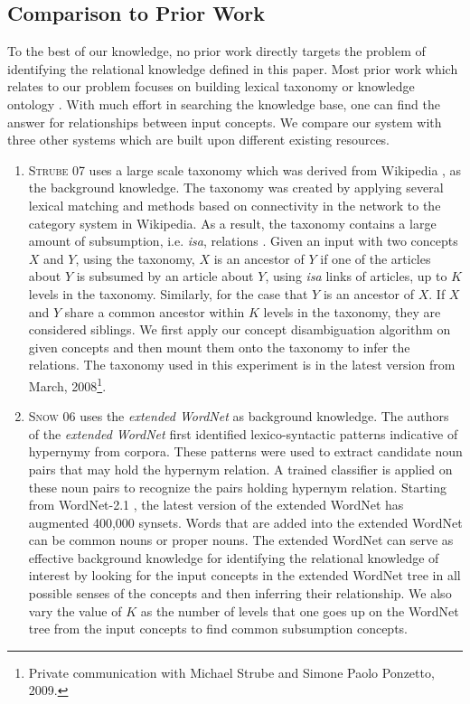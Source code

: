 \subsection{Comparison to Prior Work}

To the best of our knowledge, no prior work directly targets the
problem of identifying the relational knowledge defined in this
paper. Most prior work which relates to our problem focuses on
building lexical taxonomy or knowledge ontology
\cite{Snow2006,wikitaxo07,suchanek2007WWW}. With much effort in
searching the knowledge base, one can find the answer for relationships
between input concepts. We compare our system with three other systems
which are built upon different existing resources.

\begin{enumerate}

\item \textsc{Strube 07} uses a large scale taxonomy which was derived
  from Wikipedia \cite{wikitaxo07}, as the background knowledge. The
  taxonomy was created by applying several lexical matching and
  methods based on connectivity in the network to the category system
  in Wikipedia. As a result, the taxonomy contains a large amount of
  subsumption, i.e. {\em isa}, relations \cite{wikitaxo07}. Given an
  input with two concepts $X$ and $Y$, using the taxonomy, $X$ is an
  ancestor of $Y$ if one of the articles about $Y$ is subsumed by an
  article about $Y$, using {\em isa} links of articles, up to $K$
  levels in the taxonomy.  Similarly, for the case that $Y$ is an
  ancestor of $X$. If $X$ and $Y$ share a common ancestor within $K$
  levels in the taxonomy, they are considered siblings. We first apply
  our concept disambiguation algorithm on given concepts and then
  mount them onto the taxonomy to infer the relations. The taxonomy
  used in this experiment is in the latest version from March,
  2008\footnote{Private communication with Michael Strube and Simone
    Paolo Ponzetto, 2009.}.

\item \textsc{Snow 06} uses the {\em extended WordNet}
  \cite{ilprints665,Snow2006} as background knowledge. The authors of
  the {\em extended WordNet} \cite{ilprints665} first identified
  lexico-syntactic patterns indicative of hypernymy from
  corpora. These patterns were used to extract candidate noun pairs
  that may hold the hypernym relation. A trained classifier is applied
  on these noun pairs to recognize the pairs holding hypernym
  relation. Starting from WordNet-2.1 \cite{Fellbaum98}, the latest
  version of the extended WordNet has augmented 400,000 synsets. Words
  that are added into the extended WordNet can be common nouns or
  proper nouns. The extended WordNet can serve as effective background
  knowledge for identifying the relational knowledge of interest by
  looking for the input concepts in the extended WordNet tree in all
  possible senses of the concepts and then inferring their
  relationship. We also vary the value of $K$ as the number of levels
  that one goes up on the WordNet tree from the input concepts to find
  common subsumption concepts.


\end{enumerate}
